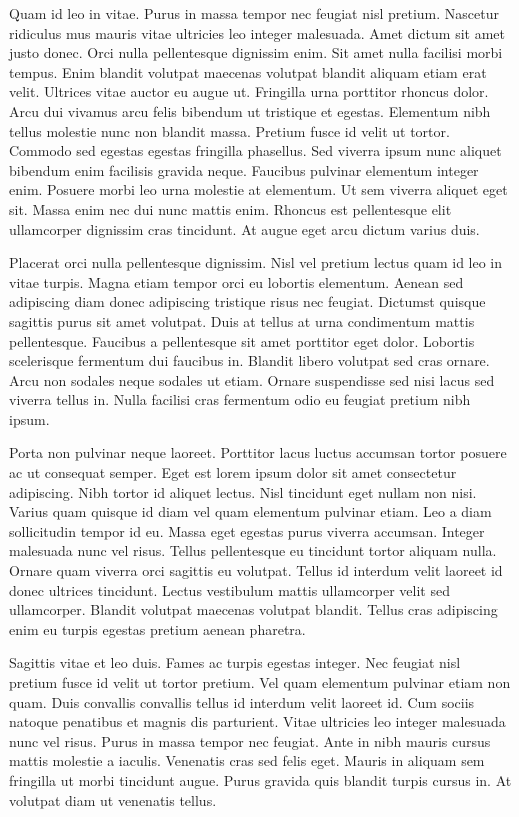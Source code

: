 \documentclass[11pt,a4paper]{article}
\begin{document}
Quam id leo in vitae. Purus in massa tempor nec feugiat nisl pretium. Nascetur ridiculus mus mauris vitae ultricies leo integer malesuada. Amet dictum sit amet justo donec. Orci nulla pellentesque dignissim enim. Sit amet nulla facilisi morbi tempus. Enim blandit volutpat maecenas volutpat blandit aliquam etiam erat velit. Ultrices vitae auctor eu augue ut. Fringilla urna porttitor rhoncus dolor. Arcu dui vivamus arcu felis bibendum ut tristique et egestas. Elementum nibh tellus molestie nunc non blandit massa. Pretium fusce id velit ut tortor. Commodo sed egestas egestas fringilla phasellus. Sed viverra ipsum nunc aliquet bibendum enim facilisis gravida neque. Faucibus pulvinar elementum integer enim. Posuere morbi leo urna molestie at elementum. Ut sem viverra aliquet eget sit. Massa enim nec dui nunc mattis enim. Rhoncus est pellentesque elit ullamcorper dignissim cras tincidunt. At augue eget arcu dictum varius duis.

Placerat orci nulla pellentesque dignissim. Nisl vel pretium lectus quam id leo in vitae turpis. Magna etiam tempor orci eu lobortis elementum. Aenean sed adipiscing diam donec adipiscing tristique risus nec feugiat. Dictumst quisque sagittis purus sit amet volutpat. Duis at tellus at urna condimentum mattis pellentesque. Faucibus a pellentesque sit amet porttitor eget dolor. Lobortis scelerisque fermentum dui faucibus in. Blandit libero volutpat sed cras ornare. Arcu non sodales neque sodales ut etiam. Ornare suspendisse sed nisi lacus sed viverra tellus in. Nulla facilisi cras fermentum odio eu feugiat pretium nibh ipsum.

Porta non pulvinar neque laoreet. Porttitor lacus luctus accumsan tortor posuere ac ut consequat semper. Eget est lorem ipsum dolor sit amet consectetur adipiscing. Nibh tortor id aliquet lectus. Nisl tincidunt eget nullam non nisi. Varius quam quisque id diam vel quam elementum pulvinar etiam. Leo a diam sollicitudin tempor id eu. Massa eget egestas purus viverra accumsan. Integer malesuada nunc vel risus. Tellus pellentesque eu tincidunt tortor aliquam nulla. Ornare quam viverra orci sagittis eu volutpat. Tellus id interdum velit laoreet id donec ultrices tincidunt. Lectus vestibulum mattis ullamcorper velit sed ullamcorper. Blandit volutpat maecenas volutpat blandit. Tellus cras adipiscing enim eu turpis egestas pretium aenean pharetra.

Sagittis vitae et leo duis. Fames ac turpis egestas integer. Nec feugiat nisl pretium fusce id velit ut tortor pretium. Vel quam elementum pulvinar etiam non quam. Duis convallis convallis tellus id interdum velit laoreet id. Cum sociis natoque penatibus et magnis dis parturient. Vitae ultricies leo integer malesuada nunc vel risus. Purus in massa tempor nec feugiat. Ante in nibh mauris cursus mattis molestie a iaculis. Venenatis cras sed felis eget. Mauris in aliquam sem fringilla ut morbi tincidunt augue. Purus gravida quis blandit turpis cursus in. At volutpat diam ut venenatis tellus.
\end{document}
